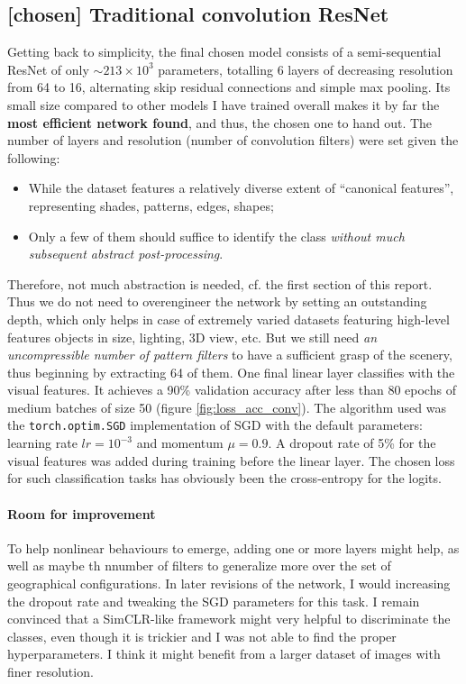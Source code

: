 \documentclass{article}
\begin{document}
\subsection{[chosen] Traditional convolution ResNet}
\label{classical_resnet}
Getting back to simplicity, the final chosen model consists of a  semi-sequential ResNet of only $\sim 213 \times 10^3$ parameters, totalling 6 layers of decreasing resolution from 64 to 16, alternating skip  residual connections and simple max pooling. Its small size compared to other models I have trained overall makes it by far the \textbf{most efficient network found}, and thus, the chosen one to hand out. The number of layers and resolution (number of convolution filters) were set given the following: 
\begin{itemize}
    \item While the dataset features a relatively diverse extent of ``canonical features'', representing shades, patterns, edges, shapes;
    \item Only a few of them should suffice to identify the class \emph{without much subsequent abstract post-processing}.
\end{itemize}
Therefore, not much abstraction is needed, cf. the first section of this report. Thus we do not need to overengineer the network by setting an outstanding depth, which only helps in case of extremely varied datasets featuring high-level features objects in size, lighting, 3D view, etc. But we still need \emph{an uncompressible number of pattern filters} to have a sufficient grasp of the scenery, thus beginning by extracting 64 of them. 
One final linear layer classifies with the visual features. It achieves a 90\% validation accuracy after less than 80 epochs of medium batches of size 50 (figure \ref{fig:loss_acc_conv}). The algorithm used was the \texttt{torch.optim.SGD} implementation of SGD with the default parameters: learning rate $lr=10^{-3}$ and momentum $\mu=0.9$. A dropout rate of 5\% for the visual features was added during training before the linear layer. The chosen loss for such classification tasks has obviously been the cross-entropy for the logits.

\paragraph{Room for improvement} To help nonlinear behaviours to emerge, adding one or more layers might help, as well as maybe th nnumber of filters to generalize more over the set of geographical configurations. In later revisions of the network, I would increasing the dropout rate and tweaking the SGD parameters for this task. I remain convinced that a SimCLR-like framework might very helpful to discriminate the classes, even though it is trickier and I was not able to find the proper hyperparameters. I think it might benefit from a larger dataset of images with finer resolution. 
\end{document}

